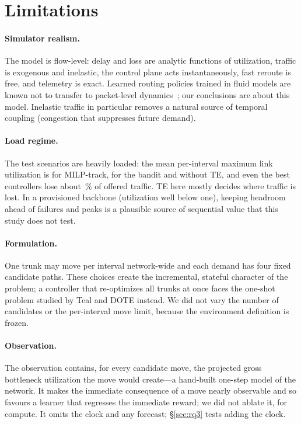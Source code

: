 \section{Limitations}
\label{sec:limitations}

\paragraph{Simulator realism.} The model is flow-level: delay and loss are
analytic functions of utilization, traffic is exogenous and inelastic, the
control plane acts instantaneously, fast reroute is free, and telemetry is
exact. Learned routing policies trained in fluid models are known not to
transfer to packet-level dynamics~\citep{boltres2024packerl}; our conclusions
are about this model. Inelastic traffic in particular removes a natural
source of temporal coupling (congestion that suppresses future demand).

\paragraph{Load regime.} The test scenarios are heavily loaded: the mean
per-interval maximum link utilization is \TestMilpMaxUtil{} for MILP-track,
\TestBanditMaxUtil{} for the bandit and \TestNoopMaxUtil{} without TE, and even
the best controllers lose about \TestMilpLossPct\,\% of offered traffic. TE
here mostly decides where traffic is lost. In a provisioned backbone
(utilization well below one), keeping headroom ahead of failures and peaks is
a plausible source of sequential value that this study does not test.

\paragraph{Formulation.} One trunk may move per interval network-wide and each
demand has four fixed candidate paths. These choices create the incremental,
stateful character of the problem; a controller that re-optimizes all trunks
at once faces the one-shot problem studied by Teal and DOTE instead. We did
not vary the number of candidates or the per-interval move limit, because the
environment definition is frozen.

\paragraph{Observation.} The observation contains, for every candidate move,
the projected gross bottleneck utilization the move would create---a
hand-built one-step model of the network. It makes the immediate consequence of
a move nearly observable and so favours a learner that regresses the
immediate reward; we did not ablate it, for compute. It omits
the clock and any forecast; \S\ref{sec:rq3} tests adding the clock.

